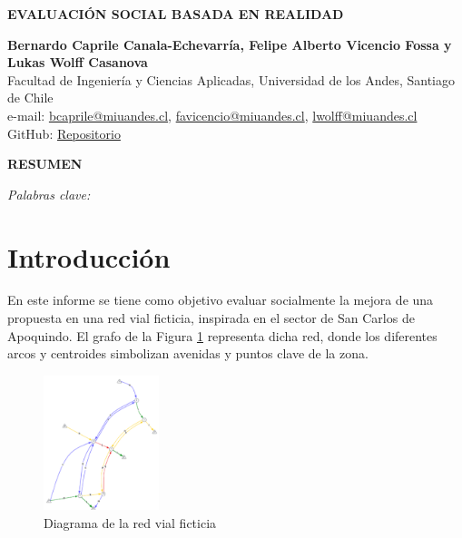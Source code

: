 \documentclass[letterpaper,12pt]{article}
\begin{document}
\begin{titlepage}
    \begin{center}
        
    
    \vspace*{1cm}


    \textbf{\Large EVALUACIÓN SOCIAL BASADA EN REALIDAD}
  
    \vspace{1cm}
    
    \textbf{Bernardo Caprile Canala-Echevarría, Felipe Alberto Vicencio Fossa y Lukas Wolff Casanova}\\
    Facultad de Ingeniería y Ciencias Aplicadas, Universidad de los Andes, Santiago de Chile\\
    e-mail: \href{mailto:bcaprile@miuandes.cl}{bcaprile@miuandes.cl}, \href{mailto:favicencio@miuandes.cl}{favicencio@miuandes.cl}, \href{mailto:lwolff@miuandes.cl}{lwolff@miuandes.cl}\\
    GitHub: \href{https://github.com/LukasWolff2002/TAREA_4_AUTITOS}{Repositorio}
    \vspace{2cm}
    
    \textbf{RESUMEN}
    \end{center}
    \vspace{0.5cm}
    


    \vspace{1cm}
    
    \textit{Palabras clave:} \textit{}
    
\end{titlepage}

\newpage
\section{Introducción}

En este informe se tiene como objetivo evaluar socialmente la mejora de una propuesta en una red vial ficticia, inspirada en el sector de San Carlos de Apoquindo. El grafo de la Figura \ref{fig:imagen1} representa dicha red, donde los diferentes arcos y centroides simbolizan avenidas y puntos clave de la zona. 


\begin{figure}[h]
    \centering
    \includegraphics[width=0.3\textwidth]{FOTOS/diagrama.png}
    \caption{Diagrama de la red vial ficticia}
    \label{fig:imagen1}
\end{figure}
\end{document}
